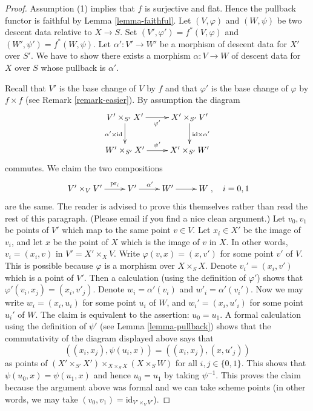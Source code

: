 \begin{proof}
Assumption (1) implies that $f$ is surjective and flat.
Hence the pullback functor is faithful by
Lemma \ref{lemma-faithful}.
Let $(V, \varphi)$ and $(W, \psi)$ be two descent data relative
to $X \to S$. Set $(V', \varphi') = f^*(V, \varphi)$ and
$(W', \psi') = f^*(W, \psi)$.
Let $\alpha' : V' \to W'$ be a morphism of descent data for $X'$ over $S'$.
We have to show there exists a morphism $\alpha : V \to W$ of
descent data for $X$ over $S$ whose pullback is $\alpha'$.

\medskip\noindent
Recall that $V'$ is the base change of $V$ by $f$ and that
$\varphi'$ is the base change of $\varphi$ by $f \times f$
(see Remark \ref{remark-easier}).
By assumption the diagram
$$
\xymatrix{
V' \times_{S'} X' \ar[r]_{\varphi'} \ar[d]_{\alpha' \times \text{id}} &
X' \times_{S'} V' \ar[d]^{\text{id} \times \alpha'} \\
W' \times_{S'} X' \ar[r]^{\psi'} &
X' \times_{S'} W'
}
$$
commutes. We claim the two compositions
$$
\xymatrix{
V' \times_V V' \ar[r]^-{\text{pr}_i} &
V' \ar[r]^{\alpha'} &
W' \ar[r] &
W
}
,\quad i = 0, 1
$$
are the same. The reader is advised to prove this themselves rather
than read the rest of this paragraph. (Please email if you find a
nice clean argument.)
Let $v_0, v_1$ be points of $V'$ which map to the same point $v \in V$.
Let $x_i \in X'$ be the image of $v_i$, and let
$x$ be the point of $X$ which is the image of $v$ in $X$. In other words,
$v_i = (x_i, v)$ in $V' = X' \times_X V$. Write
$\varphi(v, x) = (x, v')$ for some point $v'$ of $V$.
This is possible because $\varphi$ is
a morphism over $X \times_S X$. Denote
$v_i' = (x_i, v')$ which is a point of $V'$.
Then a calculation (using the definition of $\varphi'$)
shows that $\varphi'(v_i, x_j) = (x_i, v'_j)$. Denote
$w_i = \alpha'(v_i)$ and $w'_i = \alpha'(v_i')$.
Now we may write $w_i = (x_i, u_i)$ for some point $u_i$ of $W$,
and $w_i' = (x_i, u'_i)$ for some point $u_i'$ of $W$.
The claim is equivalent to the assertion: $u_0 = u_1$.
A formal calculation using the definition of $\psi'$
(see Lemma \ref{lemma-pullback}) shows
that the commutativity of the diagram displayed above says that
$$
((x_i, x_j), \psi(u_i, x)) = ((x_i, x_j), (x, u'_j))
$$
as points of
$(X' \times_{S'} X') \times_{X \times_S X} (X \times_S W)$
for all $i, j \in \{0, 1\}$. This shows that $\psi(u_0, x) = \psi(u_1, x)$
and hence $u_0 = u_1$ by taking $\psi^{-1}$.
This proves the claim because the argument above was formal
and we can take scheme points (in other words, we may
take $(v_0, v_1) = \text{id}_{V' \times_V V'}$).


\end{proof}
